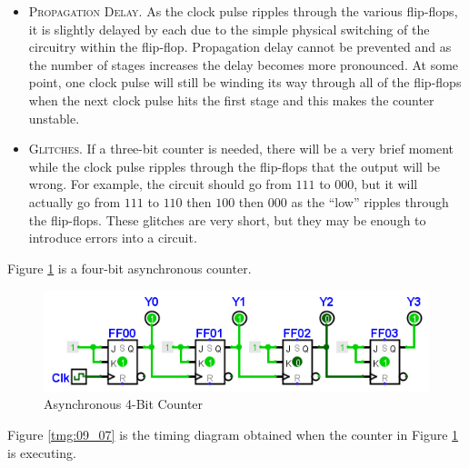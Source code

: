 \begin{itemize}
  \item \textsc{Propagation Delay}. As the clock pulse ripples through the various flip-flops, it is slightly delayed by each due to the simple physical switching of the circuitry within the flip-flop. Propagation delay cannot be prevented and as the number of stages increases the delay becomes more pronounced. At some point, one clock pulse will still be winding its way through all of the flip-flops when the next clock pulse hits the first stage and this makes the counter unstable. 

  \item \textsc{Glitches}. If a three-bit counter is needed, there will be a very brief moment while the clock pulse ripples through the flip-flops that the output will be wrong. For example, the circuit should go from $ 111 $ to $ 000 $, but it will actually go from $ 111 $ to $ 110 $ then $ 100 $ then $ 000 $ as the ``low'' ripples through the flip-flops. These glitches are very short, but they may be enough to introduce errors into a circuit.
\end{itemize}

Figure \ref{fig:09_12} is a four-bit asynchronous counter.

\begin{figure}[H]
	\centering
	\includegraphics[width=\maxwidth{.95\linewidth}]{gfx/09_12}
	\caption{Asynchronous 4-Bit Counter}
	\label{fig:09_12}
\end{figure}

Figure \ref{tmg:09_07} is the timing diagram obtained when the counter in Figure \ref{fig:09_12} is executing.

